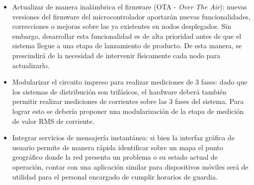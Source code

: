 \begin{itemize}
	\item Actualizar de manera inalámbrica el firmware (OTA - \textit{Over The Air}): nuevas versiones del firmware del microcontrolador aportarán nuevas funcionalidades, correcciones o mejoras sobre las ya existentes en nodos desplegados. Sin embargo, desarrollar esta funcionalidad es de alta prioridad antes de que el sistema llegue a una etapa de lanzamiento de producto. De esta manera, se prescindirá de la necesidad de intervenir físicamente cada nodo para actualizarlo.\\
	\item Modularizar el circuito impreso para realizar mediciones de 3 fases: dado que los sistemas de distribución son trifásicos, el hardware deberá también permitir realizar mediciones de corrientes sobre las 3 fases del sistema. Para lograr esto se debería proponer una modularización de la etapa de medición de valor RMS de corriente.\\
	\item Integrar servicios de mensajería instantánea: si bien la interfaz gr\'{a}fica de usuario permite de manera rápida identificar sobre un mapa el punto geográfico donde la red presenta un problema o su estado actual de operación, contar con una aplicación similar para dispositivos móviles será de utilidad para el personal encargado de cumplir horarios de guardia.\\
	
\end{itemize}

